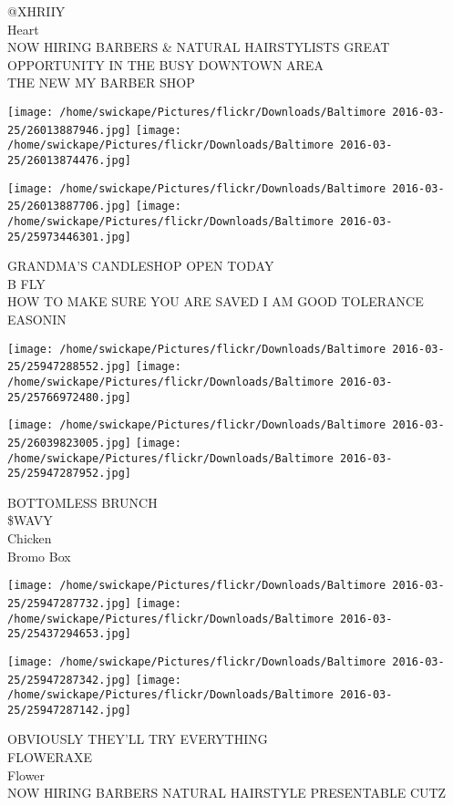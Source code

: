 \documentclass[10pt,letterpaper]{article}
\begin{document}
@XHRIIY\\
Heart\\
NOW HIRING BARBERS \& NATURAL HAIRSTYLISTS GREAT OPPORTUNITY IN THE BUSY DOWNTOWN AREA\\
THE NEW MY BARBER SHOP
\pagebreak

\texttt{[image: /home/swickape/Pictures/flickr/Downloads/Baltimore 2016-03-25/26013887946.jpg]}
\texttt{[image: /home/swickape/Pictures/flickr/Downloads/Baltimore 2016-03-25/26013874476.jpg]}

\texttt{[image: /home/swickape/Pictures/flickr/Downloads/Baltimore 2016-03-25/26013887706.jpg]}
\texttt{[image: /home/swickape/Pictures/flickr/Downloads/Baltimore 2016-03-25/25973446301.jpg]}

GRANDMA'S CANDLESHOP OPEN TODAY\\
B FLY\\
HOW TO MAKE SURE YOU ARE SAVED I AM GOOD TOLERANCE\\
EASONIN
\pagebreak

\texttt{[image: /home/swickape/Pictures/flickr/Downloads/Baltimore 2016-03-25/25947288552.jpg]}
\texttt{[image: /home/swickape/Pictures/flickr/Downloads/Baltimore 2016-03-25/25766972480.jpg]}

\texttt{[image: /home/swickape/Pictures/flickr/Downloads/Baltimore 2016-03-25/26039823005.jpg]}
\texttt{[image: /home/swickape/Pictures/flickr/Downloads/Baltimore 2016-03-25/25947287952.jpg]}

BOTTOMLESS BRUNCH\\
\$WAVY\\
Chicken\\
Bromo Box
\pagebreak

\texttt{[image: /home/swickape/Pictures/flickr/Downloads/Baltimore 2016-03-25/25947287732.jpg]}
\texttt{[image: /home/swickape/Pictures/flickr/Downloads/Baltimore 2016-03-25/25437294653.jpg]}

\texttt{[image: /home/swickape/Pictures/flickr/Downloads/Baltimore 2016-03-25/25947287342.jpg]}
\texttt{[image: /home/swickape/Pictures/flickr/Downloads/Baltimore 2016-03-25/25947287142.jpg]}

OBVIOUSLY THEY'LL TRY EVERYTHING\\
FLOWERAXE\\
Flower\\
NOW HIRING BARBERS NATURAL HAIRSTYLE PRESENTABLE CUTZ
\pagebreak
\end{document}
